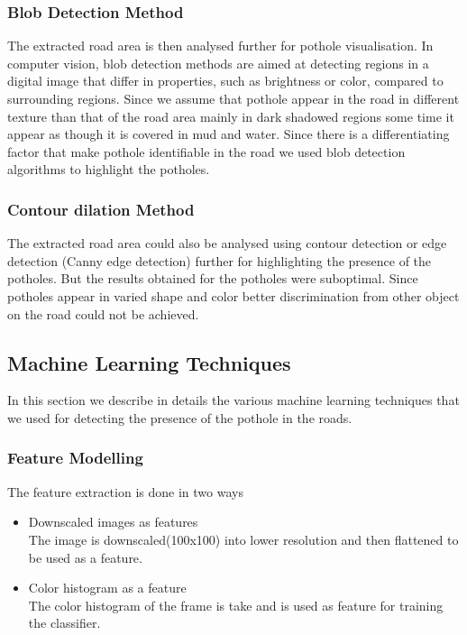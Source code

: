 \documentclass[journal]{IEEEtran}
\begin{document}
\newpage

\subsubsection{Blob Detection Method}

The extracted road area is then analysed further for pothole visualisation. In computer vision, blob detection methods are aimed at detecting regions in a digital image that differ in properties, such as brightness or color, compared to surrounding regions. Since we assume that pothole appear in the road in different texture than that of the road area mainly in dark shadowed regions some time it appear as though it is covered in mud and water. Since there is a differentiating factor that make pothole identifiable in the road we used blob detection algorithms to highlight the potholes.

\subsubsection{Contour dilation Method}
The extracted road area could also be analysed using contour detection or edge detection (Canny edge detection) further for highlighting the presence of the potholes. But the results obtained for the potholes were sub\-optimal. Since potholes appear in varied shape and color better discrimination from other object on the road could not be achieved. 

\subsection{Machine Learning Techniques}

In this section we describe in details the various machine learning techniques that we used for detecting the presence of the pothole in the roads.

\subsubsection{Feature Modelling}

The feature extraction is done in two ways 
\begin{itemize}
\item Downscaled images as features \\
The image is downscaled(100x100) into lower resolution and then flattened to be used as a feature.
\item Color histogram as a feature \\
The color histogram of the frame is take and is used as feature for training the classifier.
\end{itemize}
\end{document}
